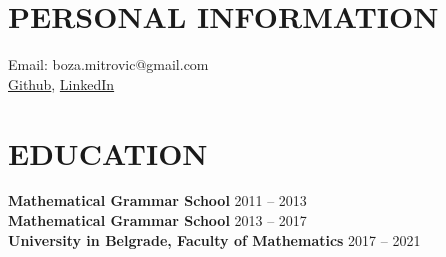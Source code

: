 \documentclass[margin,center]{res}
\begin{document}

\begin{figure}
\hfill{}\vspace*{-1cm}
\end{figure}

\begin{resume}
\section{PERSONAL INFORMATION}
{ Email:    }   boza.mitrovic@gmail.com  \\ 
\href{https://github.com/AizenAngel}{Github}, \href{https://www.linkedin.com/in/bo%C5%BEidar-mitrovi%C4%87-1a379991/}{LinkedIn}


\section{EDUCATION}
{\bf Mathematical Grammar School} \hfill 2011 -- 2013\\
{\bf Mathematical Grammar School} \hfill 2013 -- 2017\\
{\bf University in Belgrade, Faculty of Mathematics}  \hfill 2017 -- 2021



\end{resume}
\end{document}
